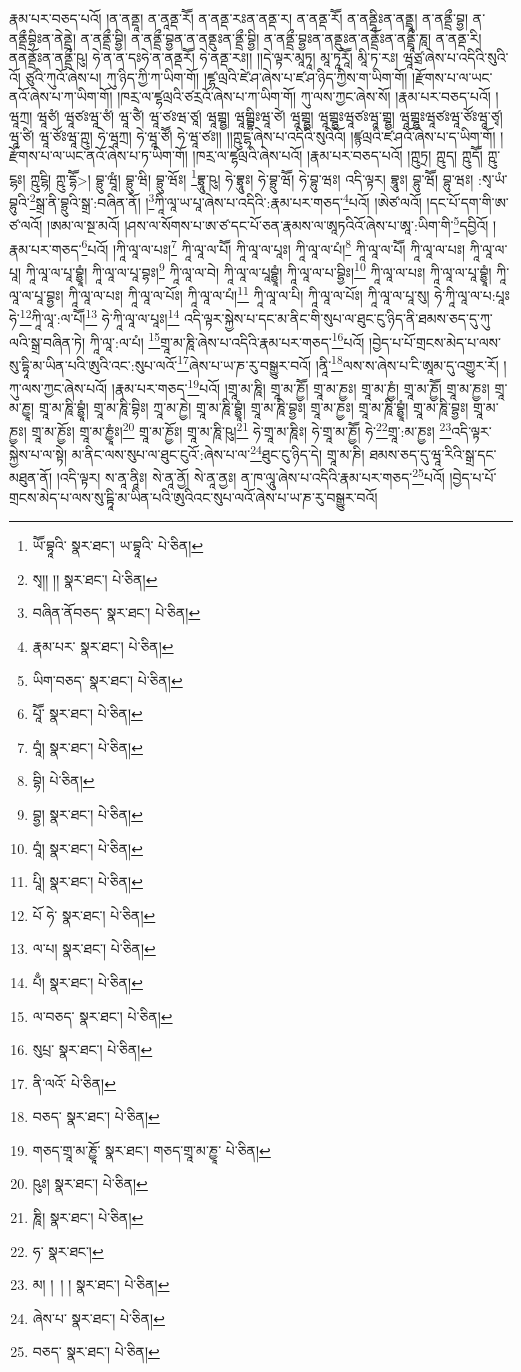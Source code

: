 རྣམ་པར་བཅད་པའོ། །ན་ནནྡཱ། ན་ནཱནྡ་རཽ། ན་ནནྡ་རཿན་ནནྡ་ར། ན་ནནྡ་རཽ། ན་ནནྡཱིཿན་ནནྡྲཱ། ན་ནནྡྲྀ་བྷྱ། ན་ནནྡྲྀབྷིཿན་ནེནྡྲེ། ན་ནནྡྲྀ་བྷྱི། ན་ནནྡྲྀ་བྷྱན་ན་ནནྡུཿན་ནྡྲྀ་བྷྱི། ན་ནནྡྲྀ་བྷྱཿན་ནནྡུཿན་ནནྡྲོཿན་ནནྡྲཱྀ་ཎཱ། ན་ནནྡ་རི། ནནནྡྲོཿན་ནནྡྲྀ་ཥུ། ཧེ་ན་ན་དཿཧེ་ན་ནནྡརཽ། ཧེ་ནནྡ་རཿ།། །།དེ་ལྟར་མཱཏཱ། མཱ་ཏཱརཱཽ། མཱི་ཏ་རཿ། ཝཱཙྲ་ཞེས་པ་འདིའི་སུའི་འོ། ཙུའི་ཀུའོ་ཞེས་པ། ཀུ་ཉིད་ཀྱི་ཀ་ཡིག་གོ། །ཛྷ་ལྲའི་ཛེ་ཤ་ཞེས་པ་ཛ་ཤ་ཉིད་ཀྱིས་ག་ཡིག་གོ། །རྫོགས་པ་ལ་ཡང་ནའོ་ཞེས་པ་ཀ་ཡིག་གོ། །ཁརྲ་ལ་ཛྷལྲའི་ཙརྲའོ་ཞེས་པ་ཀ་ཡིག་གོ། ཀུ་ལས་ཀྱང་ཞེས་སོ། །རྣམ་པར་བཅད་པའོ། །ཝཱཀྲ། ཝཱཙཾ། ཝཱཙཿཝཱ་ཙཾ། ཝཱ་ཙཻ། ཝཱ་ཙཿཝ་ཙཱ། ཝཱགྦྷྱ། ཝཱགྦྷིཿཝཱ་ཙེ། ཝཱགྦྷྱ། ཝཱགྦྷྱཿཝཱཙཿཝཱ་གྦྷྱ། ཝཱགྦྷྱཿཝཱཙཿཝཱ་ཙོཿཝཱ་ཙྭ། ཝཱ་ཙི། ཝཱ་ཙོཿཝཱ་ཀྵུ། ཧེ་ཝཱཀྲ། ཧེ་ཝཱ་ཙཽ། ཧེ་ཝཱ་ཙཿ།། །།ཀྵུངྷ་ཞེས་པ་འདིའི་སུའིའོ། །ཛྙལྲའི་ཛ་ཤའོ་ཞེས་པ་ད་ཡིག་གོ། །རྫོགས་པ་ལ་ཡང་ནའོ་ཞེས་པ་ཏ་ཡིག་གོ། །ཁརྲ་ལ་ཛྷལྲའི་ཞེས་པའོ། །རྣམ་པར་བཅད་པའོ། །ཀྵུཏྲ། ཀྵུད། ཀྵུདཽ། ཀྵུ་ངྷཿ། ཀྵུངྷི། ཀྵུ་དྷཽ>། བྷྲུ་ཝཱཾ། བྷྲུ་ཝི། བྷྲུ་ཝོཿ། \footnote{ཡཽ་བྷཱའི་  སྣར་ཐང་། ཡ་བྷཱའི་  པེ་ཅིན། }བྷྲཱུ་ཥུ། ཧེ་བྷྲཱུཿ། ཧེ་བྷྲུ་ཝཽ། ཧེ་བྷུ་ཝཿ། འདི་ལྟར། བྷཱུཿ། བྷུ་ཝཽ། བྷུ་ཝཿ། :སྭ་ཡཾ་བྷུའི་\footnote{སྭ།། །།  སྣར་ཐང་།  པེ་ཅིན། }སྒྲ་ནི་བྷྲུའི་སྒྲ་:བཞིན་ནོ། །\footnote{བཞིན་ནོབཅད་  སྣར་ཐང་།  པེ་ཅིན། }ཀཱི་ལཱ་ཡ་པཱ་ཞེས་པ་འདིའི་:རྣམ་པར་གཅད་\footnote{རྣམ་པར་  སྣར་ཐང་།  པེ་ཅིན། }པའོ། །ཨེཙ་ལའོ། །དང་པོ་དག་གི་ཨ་ཙ་ལའོ། །ཨམ་ལ་སྔ་མའོ། །ཤས་ལ་སོགས་པ་ཨ་ཙ་དང་པོ་ཅན་རྣམས་ལ་ཨཱཏའིའོ་ཞེས་པ་ཨཱ་:ཡིག་གི་\footnote{ཡིག་བཅད་  སྣར་ཐང་།  པེ་ཅིན། }དབྱིའོ། །རྣམ་པར་གཅད་\footnote{པཱཽ་  སྣར་ཐང་།  པེ་ཅིན། }པའོ། །ཀཱི་ལཱ་ལ་པཿ།\footnote{བཱཾ།  སྣར་ཐང་།  པེ་ཅིན། } ཀཱི་ལཱ་ལ་པཽ། ཀཱི་ལཱ་ལ་པཱཿ། ཀཱི་ལཱ་ལ་པཾ།\footnote{བྷི།  པེ་ཅིན། } ཀཱི་ལཱ་ལ་པཽ། ཀཱི་ལཱ་ལ་པཿ། ཀཱི་ལཱ་ལ་པཱ། ཀཱི་ལཱ་ལ་པཱ་བྷྱཱཾ། ཀཱི་ལཱ་ལ་པཱ་བྷཿ།\footnote{བྷྱ།  སྣར་ཐང་།  པེ་ཅིན། } ཀཱི་ལཱ་ལ་བེ། ཀཱི་ལཱ་ལ་པཱབྷྱཱཾ། ཀཱི་ལཱ་ལ་པ་བྷྱིཿ།\footnote{བཱཾ།  སྣར་ཐང་།  པེ་ཅིན། } ཀཱི་ལཱ་ལ་པཿ། ཀཱི་ལཱ་ལ་པཱ་བྷྱཱཾ། ཀཱི་ལཱ་ལ་པཱ་བྷྱཿ། ཀཱི་ལཱ་ལ་པཿ། ཀཱི་ལཱ་ལ་པོཿ། ཀཱི་ལཱ་ལ་པཾ།\footnote{པཱི།  སྣར་ཐང་།  པེ་ཅིན། } ཀཱི་ལཱ་ལ་པི། ཀཱི་ལཱ་ལ་པོཿ། ཀཱི་ལཱ་ལ་པཱ་སུ། ཧེ་ཀཱི་ལཱ་ལ་པ:པཱཿཧེ་\footnote{པོ ཧེ་  སྣར་ཐང་།  པེ་ཅིན། }ཀཱི་ལཱ་:ལ་པཽ།\footnote{ལ་པ།  སྣར་ཐང་།  པེ་ཅིན། } ཧེ་ཀཱི་ལཱ་ལ་པཱཿ།\footnote{པྃ།  སྣར་ཐང་།  པེ་ཅིན། } འདི་ལྟར་སྐྱེས་པ་དང་མ་ནིང་གི་སུཔ་ལ་ཐུང་ངུ་ཉིད་ནི་ཐམས་ཅད་དུ་ཀུ་ལའི་སྒྲ་བཞིན་ཏེ། ཀཱི་ལཱ་:ལ་པཾ། \footnote{ལ་བཅད་  སྣར་ཐང་།  པེ་ཅིན། }གྲཱ་མ་ཎཱི་ཞེས་པ་འདིའི་རྣམ་པར་གཅད་\footnote{སུཔྲ་  སྣར་ཐང་།  པེ་ཅིན། }པའོ། །བྱེད་པ་པོ་གྲངས་མེད་པ་ལས་སུ་དྷཱི་མ་ཡིན་པའི་ཨུའི་འང་:སུཔ་ལའོ་\footnote{ནི་ལའོ་  པེ་ཅིན། }ཞེས་པ་ཡ་ཎ་རུ་བསྒྱུར་བའོ། །ནཱི་\footnote{བཅད་  སྣར་ཐང་།  པེ་ཅིན། }ལས་ས་ཞེས་པ་ངི་ཨཱམ་དུ་འགྱུར་རོ། །ཀུ་ལས་ཀྱང་ཞེས་པའོ། །རྣམ་པར་གཅད་\footnote{གཅད་གྲཱ་མ་ཎྱཱོ་  སྣར་ཐང་། གཅད་གྲཱ་མ་ཎྱཱ་  པེ་ཅིན། }པའོ། །གྲཱ་མ་ཎཱི། གྲཱ་མ་ཎྱཽ། གྲཱ་མ་ཎྱཿ། གྲཱ་མ་ཎྱཾ། གྲཱ་མ་ཎྱཽ། གྲཱ་མ་ཎྱཿ། གྲཱ་མ་ཎྱཱ། གྲཱ་མ་ཎཱི་བྷྱཱཾ། གྲཱ་མ་ཎཱི་བྷིཿ། ཀྲཱ་མ་ཎྱེ། གྲཱ་མ་ཎཱི་བྷྱཱཾ། གྲཱ་མ་ཎཱི་བྷྱཿ། གྲཱ་མ་ཎྱཿ། གྲཱ་མ་ཎཱི་བྷྱཱཾ། གྲཱ་མ་ཎཱི་བྷྱཿ། གྲཱ་མ་ཎྱཿ། གྲཱ་མ་ཎྱོཿ། གྲཱ་མ་ཎྱཱཾཿ།\footnote{ཥུཿ།  སྣར་ཐང་།  པེ་ཅིན། } གྲཱ་མ་ཎྱོཿ། གྲཱ་མ་ཎཱི་ཥུ།\footnote{ཎཱི།  སྣར་ཐང་།  པེ་ཅིན། } ཧེ་གྲཱ་མ་ཎཱིཿ། ཧེ་གྲཱ་མ་ཎྱཽ། ཧེ་\footnote{ཧ་  སྣར་ཐང་། }གྲཱ་:མ་ཎྱཿ། \footnote{མ། ། ། །   སྣར་ཐང་།  པེ་ཅིན། }འདི་ལྟར་སྐྱེས་པ་ལ་སྟེ། མ་ནིང་ལས་སུཔ་ལ་ཐུང་ངུའོ་:ཞེས་པ་ལ་\footnote{ཞེས་པ་  སྣར་ཐང་།  པེ་ཅིན། }ཐུང་ངུ་ཉིད་དེ། གྲཱ་མ་ཎི། ཐམས་ཅད་དུ་ཝཱ་རིའི་སྒྲ་དང་མཐུན་ནོ། །འདི་ལྟར། ས་ནཱ་ནཱིཿ། སེ་ནཱ་ནྱོ། སེ་ནཱ་ནྱཿ། ན་ཁ་ལཱུ་ཞེས་པ་འདིའི་རྣམ་པར་གཅད་\footnote{བཅད་  སྣར་ཐང་།  པེ་ཅིན། }པའོ། །བྱེད་པ་པོ་གྲངས་མེད་པ་ལས་སུ་དྟཱི་མ་ཡིན་པའི་ཨུའིའང་སུཔ་ལའོ་ཞེས་པ་ཡ་ཎ་རུ་བསྒྱུར་བའོ། 
